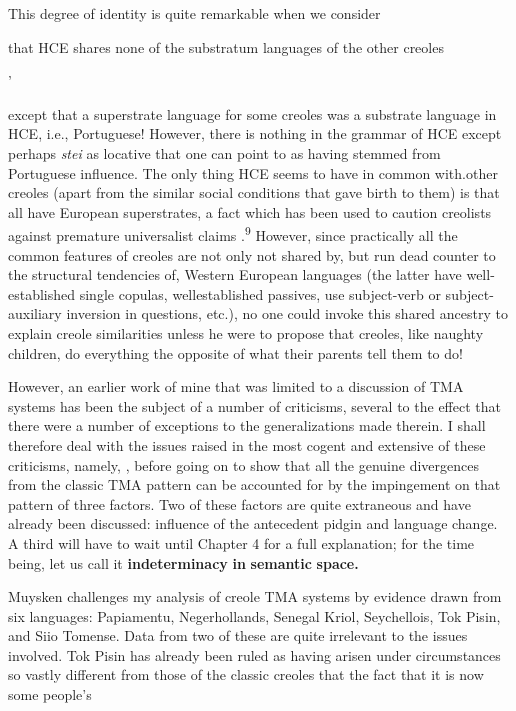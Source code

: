 This degree of identity is quite remarkable when we consider

that HCE shares none of the substratum languages of the other creoles\-

'


except that a superstrate language for some creoles was a substrate language in HCE, i.e., Portuguese! However, there is nothing in the grammar of HCE except perhaps \textit{stei }as locative that one can point to as having stemmed from Portuguese influence. The only thing HCE seems to have in common with.other creoles (apart from the simi\-lar social conditions that gave birth to them) is that all have European superstrates, a fact which has been used to caution creolists against premature universalist claims \citep{Reinecke1977}.\textsuperscript{9} However, since practi\-cally all the common features of creoles are not only not shared by, but run dead counter to the structural tendencies of, Western Euro\-pean languages (the latter have well-established single copulas, well\-established passives, use subject-verb or subject-auxiliary inversion in questions, etc.), no one could invoke this shared ancestry to explain creole similarities unless he were to propose that creoles, like naughty children, do everything the opposite of what their parents tell them to do!

However, an earlier work of mine \citep{Bickerton1974} that was limited to a discussion of TMA systems has been the subject of a number of criticisms, several to the effect that there were a number of exceptions to the generalizations made therein. I shall therefore deal with the issues raised in the most cogent and extensive of these criti\-cisms, namely, \citet{Muysken1981a}, before going on to show that all the genuine divergences from the classic TMA pattern can be accounted for by the impingement on that pattern of three factors. Two of these factors are quite extraneous and have already been discussed: influence of the antecedent pidgin and language change. A third will have to wait until Chapter 4 for a full explanation; for the time being, let us call it \textbf{{\textquotedbl}indeterminacy} \textbf{in} \textbf{semantic} \textbf{space.{\textquotedbl}}

Muysken challenges my analysis of creole TMA systems by evidence drawn from six languages: Papiamentu, Negerhollands, Senegal Kriol, Seychellois, Tok Pisin, and Siio Tomense. Data from two of these are quite irrelevant to the issues involved. Tok Pisin has already been ruled as having arisen under circumstances so vastly different from those of the classic creoles that the fact that it is now some people's

